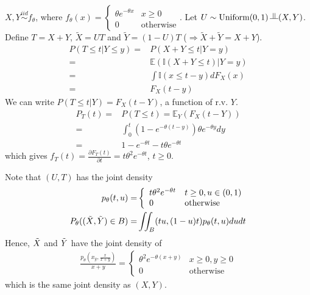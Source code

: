 \begin{example}
    $X, Y\overset{iid}{\sim}f_\theta$, where $f_\theta(x)=\left\{\begin{array}{ll}
        \theta e^{-\theta x} & x\geq 0 \\
        0 & \text{otherwise}
    \end{array}\right.$.
    Let $U\sim\text{Uniform}(0,1)\vperp(X,Y)$. 
    Define $T=X+Y$, $\tilde{X}=UT$ and $\tilde{Y}=(1-U)T$ ($\Rightarrow\tilde{X}+\tilde{Y}=X+Y$).
    \begin{align}
        P(T\leq t|Y\leq y)
        =& P(X+Y\leq t|Y=y)\\
        =& \mathbb{E}(\mathbb{I}(X+Y\leq t)|Y=y)\\
        =& \int\mathbb{I}(x\leq t-y)dF_X(x)\\
        =& F_X(t-y)
    \end{align}
    We can write $P(T\leq t|Y)=F_X(t-Y)$, a function of r.v. $Y$.
    \begin{align}
        P_T(t)
        =& P(T\leq t) = \mathbb{E}_Y(F_X(t-Y))\\
        =& \int_{0}^t{(1-e^{-\theta(t-y)})\theta e^{-\theta y}}dy\\
        =& 1-e^{-\theta t} - t\theta e^{-\theta t}
    \end{align}
    which gives $f_T(t)=\frac{\partial F_T(t)}{\partial t}=t\theta^2e^{-\theta t}$, $t\geq 0$.

    Note that $(U,T)$ has the joint density
    \begin{align}
        p_\theta(t,u)=&\left\{\begin{array}{ll}
            t\theta^2e^{-\theta t} & t\geq 0,u\in(0,1) \\
            0 & \text{otherwise}
        \end{array}\right.\\
        P_\theta((\Tilde{X},\Tilde{Y})\in B)=&\iint_{B}(tu,(1-u)t)p_\theta(t,u)dudt
    \end{align}
    Hence, $\Tilde{X}$ and $\Tilde{Y}$ have the joint density of
    \begin{gather}
        \frac{p_\theta(x_y,\frac{x}{x+y})}{x+y}=\left\{\begin{array}{ll}
            \theta^2e^{-\theta(x+y)} & x\geq 0,y\geq 0 \\
            0 & \text{otherwise}
        \end{array}\right.
    \end{gather}
    which is the same joint density as $(X,Y)$.
\end{example}

